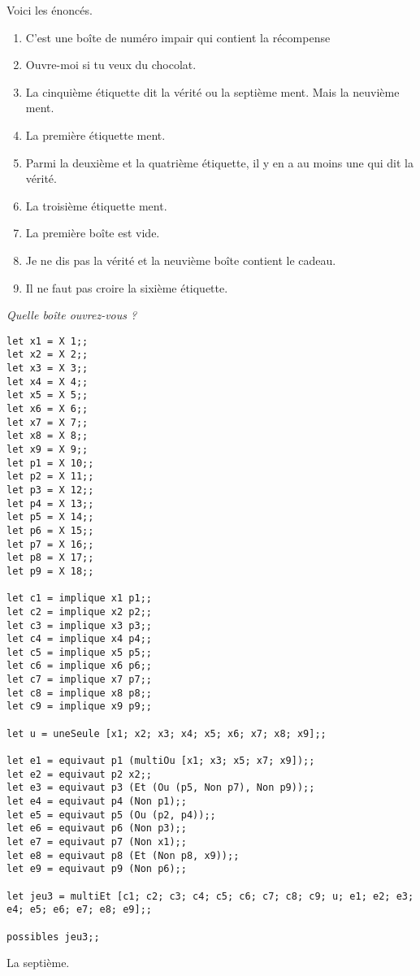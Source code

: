 Voici les énoncés.


\begin{enumerate}
\item C’est une boîte de numéro impair qui contient la récompense
\item Ouvre-moi si tu veux du chocolat.
\item La cinquième étiquette dit la vérité ou la septième ment. Mais la neuvième ment.
\item La première étiquette ment.
\item Parmi la deuxième et la quatrième étiquette, il y en a au moins une qui dit la vérité.
\item La troisième étiquette ment.
\item La première boîte est vide.
\item Je ne dis pas la vérité et la neuvième boîte contient le cadeau.
\item Il ne faut pas croire la sixième étiquette.
\end{enumerate}
\begin{Exercise}\it 
Quelle boîte ouvrez-vous ?
\end{Exercise}
\begin{Answer}
\begin{lstlisting}
let x1 = X 1;;
let x2 = X 2;;
let x3 = X 3;;
let x4 = X 4;;
let x5 = X 5;;
let x6 = X 6;;
let x7 = X 7;;
let x8 = X 8;;
let x9 = X 9;;
let p1 = X 10;;
let p2 = X 11;;
let p3 = X 12;;
let p4 = X 13;;
let p5 = X 14;;
let p6 = X 15;;
let p7 = X 16;;
let p8 = X 17;;
let p9 = X 18;;

let c1 = implique x1 p1;;
let c2 = implique x2 p2;;
let c3 = implique x3 p3;;
let c4 = implique x4 p4;;
let c5 = implique x5 p5;;
let c6 = implique x6 p6;;
let c7 = implique x7 p7;;
let c8 = implique x8 p8;;
let c9 = implique x9 p9;;

let u = uneSeule [x1; x2; x3; x4; x5; x6; x7; x8; x9];;

let e1 = equivaut p1 (multiOu [x1; x3; x5; x7; x9]);;
let e2 = equivaut p2 x2;;
let e3 = equivaut p3 (Et (Ou (p5, Non p7), Non p9));;
let e4 = equivaut p4 (Non p1);;
let e5 = equivaut p5 (Ou (p2, p4));;
let e6 = equivaut p6 (Non p3);;
let e7 = equivaut p7 (Non x1);;
let e8 = equivaut p8 (Et (Non p8, x9));;
let e9 = equivaut p9 (Non p6);;

let jeu3 = multiEt [c1; c2; c3; c4; c5; c6; c7; c8; c9; u; e1; e2; e3; e4; e5; e6; e7; e8; e9];; 

possibles jeu3;;
\end{lstlisting}
La septième.
\end{Answer}
